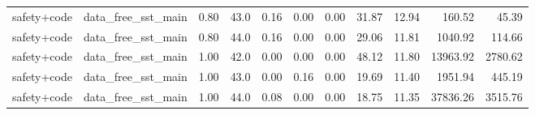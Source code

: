 \begin{table}[H]
{\begin{tabular}{llllrrrrrrr}
safety+code & data\_free\_sst\_main & 0.80 & 43.0 & 0.16 & 0.00 & 0.00 & 31.87 & 12.94 & 160.52 & 45.39 \\
safety+code & data\_free\_sst\_main & 0.80 & 44.0 & 0.16 & 0.00 & 0.00 & 29.06 & 11.81 & 1040.92 & 114.66 \\
safety+code & data\_free\_sst\_main & 1.00 & 42.0 & 0.00 & 0.00 & 0.00 & 48.12 & 11.80 & 13963.92 & 2780.62 \\
safety+code & data\_free\_sst\_main & 1.00 & 43.0 & 0.00 & 0.16 & 0.00 & 19.69 & 11.40 & 1951.94 & 445.19 \\
safety+code & data\_free\_sst\_main & 1.00 & 44.0 & 0.08 & 0.00 & 0.00 & 18.75 & 11.35 & 37836.26 & 3515.76 \\
\bottomrule
\end{tabular}
}
\end{table}
